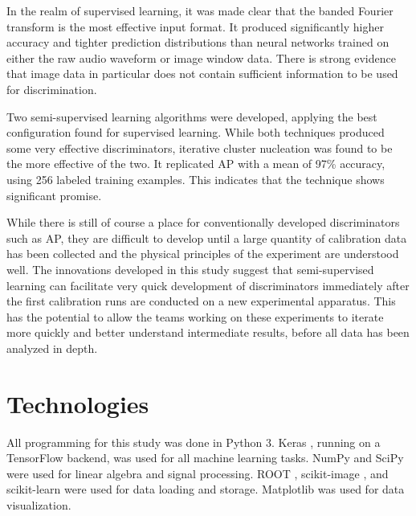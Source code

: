 \documentclass[10pt]{article}
\begin{document}
In the realm of supervised learning, it was made clear that the banded Fourier transform is the most effective input format. It produced significantly higher accuracy and tighter prediction distributions than neural networks trained on either the raw audio waveform or image window data. There is strong evidence that image data in particular does not contain sufficient information to be used for discrimination.

Two semi-supervised learning algorithms were developed, applying the best configuration found for supervised learning. While both techniques produced some very effective discriminators, iterative cluster nucleation was found to be the more effective of the two. It replicated AP with a mean of 97\% accuracy, using 256 labeled training examples. This indicates that the technique shows significant promise.

While there is still of course a place for conventionally developed discriminators such as AP, they are difficult to develop until a large quantity of calibration data has been collected and the physical principles of the experiment are understood well. The innovations developed in this study suggest that semi-supervised learning can facilitate very quick development of discriminators immediately after the first calibration runs are conducted on a new experimental apparatus. This has the potential to allow the teams working on these experiments to iterate more quickly and better understand intermediate results, before all data has been analyzed in depth.

\section{Technologies}

All programming for this study was done in Python 3. Keras \cite{keras}, running on a TensorFlow backend, was used for all machine learning tasks. NumPy \cite{numpy} and SciPy \cite{scipy} were used for linear algebra and signal processing. ROOT \cite{root}, scikit-image \cite{scikit-image}, and scikit-learn \cite{scikit-learn} were used for data loading and storage. Matplotlib was used for data visualization.

\printbibliography
\end{document}
